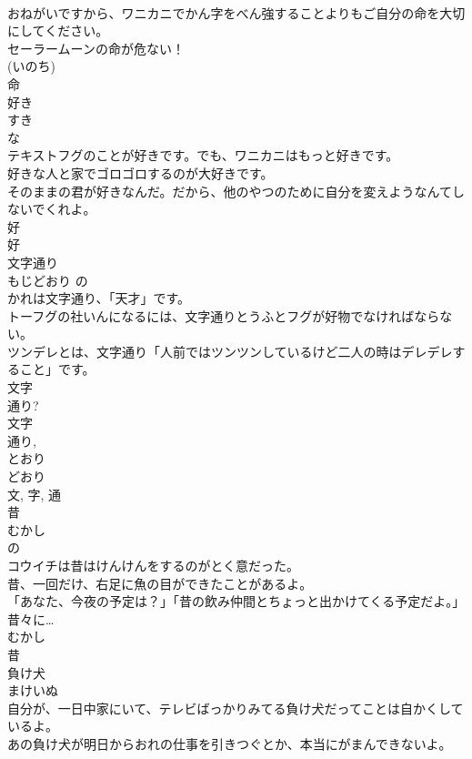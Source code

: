 \documentclass[8pt]{extreport}
\begin{document}
\begin{CJK}{UTF8}{min}
\\	おねがいですから、ワニカニでかん字をべん強することよりもご自分の命を大切にしてください。	
\\	セーラームーンの命が危ない！	
\\	(いのち) 
\\	命	
\\	好き	
\\	すき	
\\	な 
\\	テキストフグのことが好きです。でも、ワニカニはもっと好きです。	
\\	好きな人と家でゴロゴロするのが大好きです。	
\\	そのままの君が好きなんだ。だから、他のやつのために自分を変えようなんてしないでくれよ。	
\\	好 
\\	好	
\\	文字通り	
\\	もじどおり	の 
\\	かれは文字通り、「天才」です。	
\\	トーフグの社いんになるには、文字通りとうふとフグが好物でなければならない。	
\\	ツンデレとは、文字通り「人前ではツンツンしているけど二人の時はデレデレすること」です。	
\\	文字 
\\	通り? 
\\	文字 
\\	通り, 
\\	とおり 
\\	どおり 
\\	文, 字, 通	
\\	昔	
\\	むかし	
\\	の 
\\	コウイチは昔はけんけんをするのがとく意だった。	
\\	昔、一回だけ、右足に魚の目ができたことがあるよ。	
\\	「あなた、今夜の予定は？」「昔の飲み仲間とちょっと出かけてくる予定だよ。」	
\\	昔々に… 
\\	むかし 
\\	昔	
\\	負け犬	
\\	まけいぬ	
\\	自分が、一日中家にいて、テレビばっかりみてる負け犬だってことは自かくしているよ。	
\\	あの負け犬が明日からおれの仕事を引きつぐとか、本当にがまんできないよ。	

\end{CJK}
\end{document}
